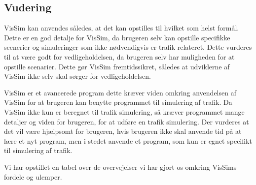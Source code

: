 \begin{figure}[H]
\caption{}\label{GrafForDecelerationVisSimGPS}
\end{figure}

\subsection{Vudering}
VisSim kan anvendes således, at det kan opstilles til hvilket som helst formål. Dette er en god detalje for VisSim, da brugeren selv kan opstille specifikke scenerier og simuleringer som ikke nødvendigvis er trafik relateret. Dette vurderes til at være godt for vedligeholdelsen, da brugeren selv har muligheden for at opstille scenarier. Dette gør VisSim fremtidssikret, således at udviklerne af VisSim ikke selv skal sørger for vedligeholdelsen.

VisSim er et avancerede program dette kræver viden omkring anvendelsen af VisSim for at brugeren kan benytte programmet til simulering af trafik. Da VisSim ikke kun er beregnet til trafik simulering, så kræver programmet mange detaljer og viden for brugeren, for at udføre en trafik simulering. Der vurderes at det vil være hjælpsomt for brugeren, hvis brugeren ikke skal anvende tid på at lære et nyt program, men i stedet anvende et program, som kun er egnet specifikt til simulering af trafik. 

Vi har opstillet en tabel over de overvejelser vi har gjort os omkring VisSims fordele og ulemper.



